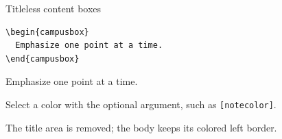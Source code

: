 \begin{frame}[fragile]{Titleless content boxes}
  \begin{verbatim}
\begin{campusbox}
  Emphasize one point at a time.
\end{campusbox}
  \end{verbatim}
  \begin{campusbox}
    Emphasize one point at a time.
  \end{campusbox}
  \begin{campusbox}[notecolor]
    Select a color with the optional argument, such as \texttt{[notecolor]}.
  \end{campusbox}
  \begin{campusbox}[alertcolor]
    The title area is removed; the body keeps its colored left border.
  \end{campusbox}
\end{frame}
